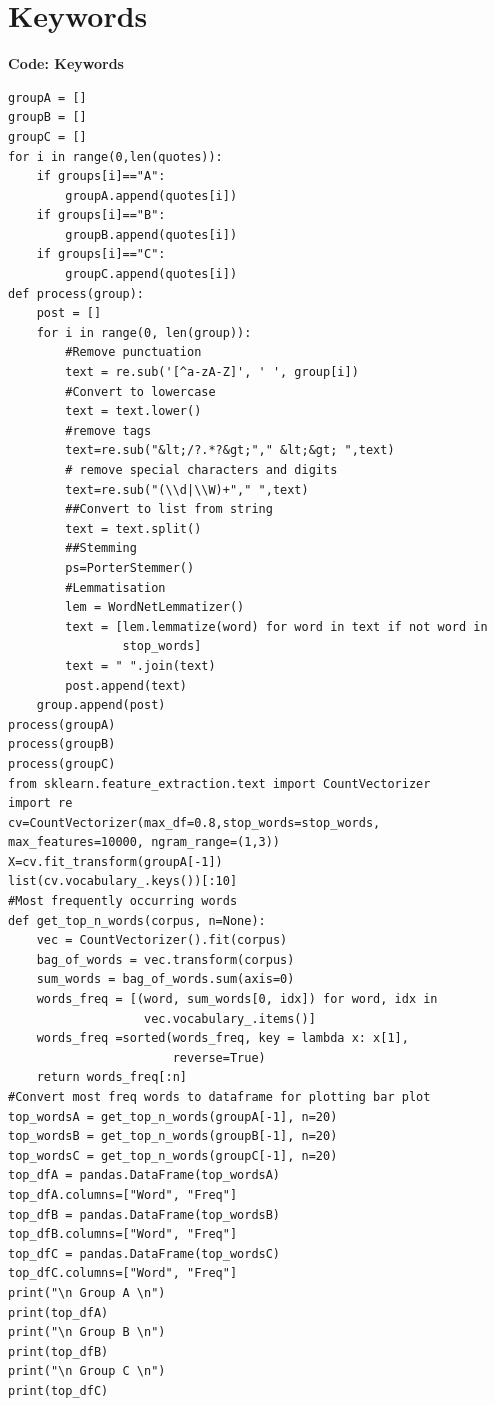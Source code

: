 \section{Keywords}

\textbf{Code: Keywords}

\begin{lstlisting}
groupA = []
groupB = []
groupC = []
for i in range(0,len(quotes)):
    if groups[i]=="A":
        groupA.append(quotes[i])
    if groups[i]=="B":
        groupB.append(quotes[i])
    if groups[i]=="C":
        groupC.append(quotes[i])
def process(group):
    post = []
    for i in range(0, len(group)):
        #Remove punctuation
        text = re.sub('[^a-zA-Z]', ' ', group[i])
        #Convert to lowercase
        text = text.lower()
        #remove tags
        text=re.sub("&lt;/?.*?&gt;"," &lt;&gt; ",text)
        # remove special characters and digits
        text=re.sub("(\\d|\\W)+"," ",text)
        ##Convert to list from string
        text = text.split()
        ##Stemming
        ps=PorterStemmer()
        #Lemmatisation
        lem = WordNetLemmatizer()
        text = [lem.lemmatize(word) for word in text if not word in  
                stop_words] 
        text = " ".join(text)
        post.append(text)
    group.append(post)
process(groupA)
process(groupB)
process(groupC)
from sklearn.feature_extraction.text import CountVectorizer
import re
cv=CountVectorizer(max_df=0.8,stop_words=stop_words, max_features=10000, ngram_range=(1,3))
X=cv.fit_transform(groupA[-1])
list(cv.vocabulary_.keys())[:10]
#Most frequently occurring words
def get_top_n_words(corpus, n=None):
    vec = CountVectorizer().fit(corpus)
    bag_of_words = vec.transform(corpus)
    sum_words = bag_of_words.sum(axis=0) 
    words_freq = [(word, sum_words[0, idx]) for word, idx in      
                   vec.vocabulary_.items()]
    words_freq =sorted(words_freq, key = lambda x: x[1], 
                       reverse=True)
    return words_freq[:n]
#Convert most freq words to dataframe for plotting bar plot
top_wordsA = get_top_n_words(groupA[-1], n=20)
top_wordsB = get_top_n_words(groupB[-1], n=20)
top_wordsC = get_top_n_words(groupC[-1], n=20)
top_dfA = pandas.DataFrame(top_wordsA)
top_dfA.columns=["Word", "Freq"]
top_dfB = pandas.DataFrame(top_wordsB)
top_dfB.columns=["Word", "Freq"]
top_dfC = pandas.DataFrame(top_wordsC)
top_dfC.columns=["Word", "Freq"]
print("\n Group A \n")
print(top_dfA)
print("\n Group B \n")
print(top_dfB)
print("\n Group C \n")
print(top_dfC)
\end{lstlisting}

